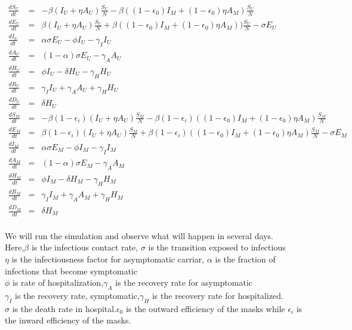 \documentclass{article}
\begin{document}
\begin{minipage}{0.35\textwidth}
\tiny
\begin{eqnarray}
  \frac{dS_{U}}{dt} &=& -\beta(I_{U}+\eta A_{U})\frac{S_{U}}{N}-\beta((1-\epsilon_{0})I_{M}+(1-\epsilon_{0})\eta A_{M})\frac{S_{U}}{N}\nonumber\\
  \frac{dE_{U}}{dt} &=& \beta(I_{U}+\eta{A}_{U})\frac{S_{U}}{N}+\beta((1-\epsilon_{0})I_{M}+(1-\epsilon_{0})\eta A_{M}))\frac{S_{U}}{N}-\sigma E_{U}\nonumber\\
  \frac{dI_{U}}{dt} &=& \alpha\sigma E_{U}-\phi I_{U}-\gamma_{I}I_{U}\nonumber\\
  \frac{dA_{U}}{dt} &=& (1-\alpha)\sigma E_{U}-\gamma_{A}A_{U}\nonumber\\
  \frac{dH_{U}}{dt} &=& \phi I_{U}-\delta H_{U}-\gamma_{H}H_{U}\nonumber\\
  \frac{dR_{U}}{dt} &=& \gamma_{I}I_{U}+\gamma_{A}A_{U}+\gamma_{H}H_{U}\nonumber\\
  \frac{dD_{U}}{dt} &=& \delta H_{U}\nonumber\\
  \frac{dS_{M}}{dt} &=& -\beta(1-\epsilon_{i})(I_{U}+\eta A_{U})\frac{S_{M}}{N}-\beta(1-\epsilon_{i})((1-\epsilon_{0})I_{M}+(1-\epsilon_{0})\eta A_{M})\frac{S_{M}}{N}\nonumber\\
  \frac{dE_{M}}{dt} &=& \beta(1-\epsilon_{i})(I_{U}+\eta A_{U})\frac{S_{M}}{N}+\beta(1-\epsilon_{i})((1-\epsilon_{0})I_{M}+(1-\epsilon_{0})\eta A_{M})\frac{S_{M}}{N}-\sigma E_{M} \nonumber\\
  \frac{dI_{M}}{dt} &=& \alpha\sigma E_{M} - \phi I_{M}-\gamma_{I} I_{M}\nonumber\\
  \frac{dA_{M}}{dt} &=& (1-\alpha)\sigma E_{M}-\gamma_{A}A_{M}\nonumber\\
  \frac{dH_{M}}{dt} &=& \phi I_{M}-\delta H_{M}-\gamma_{H}H_{M}\nonumber\\
  \frac{dR_{M}}{dt} &=& \gamma_{I}I_{M} +\gamma_{A}A_{M}+\gamma_{H}H_{M}\nonumber\\
  \frac{dD_{M}}{dt} &=& \delta H_{M}\nonumber\\
\end{eqnarray}
\end{minipage}

We will run the simulation and observe what will happen in several days. \\Here,$\beta$ is the infectious contact rate, $\sigma$ is the transition exposed to infectious\\$\eta$ is the infectiousness factor for asymptomatic carriar, $\alpha$ is the fraction of infections that become symptomatic\\
$\phi$ is rate of hospitalization,$\gamma_{A}$ is the recovery rate for asymptomatic
\\$\gamma_{I}$ is the recovery rate, symptomatic,$\gamma_{H}$ is the recovery rate for hospitalized.\\$\sigma$ is the death rate in hospital.$\epsilon_{0}$ is the outward efficiency of the masks while $\epsilon_{i}$ is the inward efficiency of the masks.\\
\end{document}
